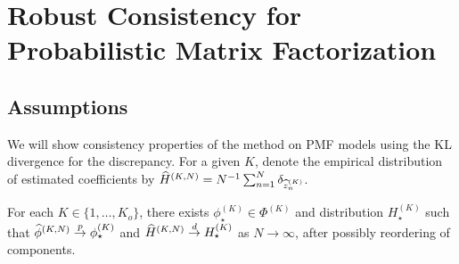 \section{Robust Consistency for Probabilistic Matrix Factorization} \label{sec:PMF-consistency-proof}

\subsection{Assumptions}

We will show consistency properties of the method on PMF models using the KL divergence for the discrepancy. 
For a given $K$, denote the empirical distribution of estimated coefficients by $\widehat{H}^{(K,N)} = N^{-1}\sum^{N}_{n=1}\delta_{\widehat{z}^{(K)}_{n}}$.
\begin{assumption}\label{assump:consistency}
	For each $K \in \{1,\dots,K_{o}\}$, there exists ${\phi}^{(K)}_{\star} \in\Phi^{(K)}$ and distribution $H^{(K)}_{\star}$ such that ${\widehat{\phi}}^{(K,N)} \overset{p}{\to} {\phi}^{(K)}_{\star}$ and $\widehat{H}^{(K,N)}\overset{d}{\to} H^{(K)}_{\star}$ as $N\to \infty$, after possibly reordering of components.
\end{assumption}

